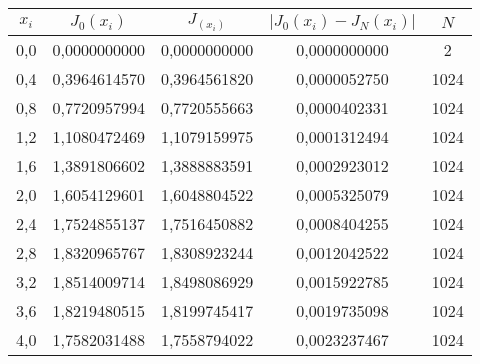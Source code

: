 \documentclass[a4paper,12pt]{article}
\begin{document}
{\begin{enumerate}[label = \arabic*.]
{\begin{table}[h]
\begin{tabular}{|c|c|c|c|c|}
            \hline
            $x_i$ & $J_0(x_i)$ & $J_(x_i)$ & $\left|J_0(x_i) - J_N(x_i)\right|$ & $N$\\
            \hline
            0,0 & 0,0000000000 & 0,0000000000 & 0,0000000000 & 2 \\
            \hline
            0,4 & 0,3964614570 & 0,3964561820 & 0,0000052750 & 1024 \\
            \hline
            0,8 & 0,7720957994 & 0,7720555663 & 0,0000402331 & 1024 \\
            \hline
            1,2 & 1,1080472469 & 1,1079159975 & 0,0001312494 & 1024 \\
            \hline
            1,6 & 1,3891806602 & 1,3888883591 & 0,0002923012 & 1024 \\
            \hline
            2,0 & 1,6054129601 & 1,6048804522 & 0,0005325079 & 1024 \\
            \hline
            2,4 & 1,7524855137 & 1,7516450882 & 0,0008404255 & 1024 \\
            \hline
            2,8 & 1,8320965767 & 1,8308923244 & 0,0012042522 & 1024 \\
            \hline
            3,2 & 1,8514009714 & 1,8498086929 & 0,0015922785 & 1024 \\
            \hline
            3,6 & 1,8219480515 & 1,8199745417 & 0,0019735098 & 1024 \\
            \hline
            4,0 & 1,7582031488 & 1,7558794022 & 0,0023237467 & 1024 \\
            \hline


\end{tabular}
\end{table}}
\end{enumerate}}
\end{document}
